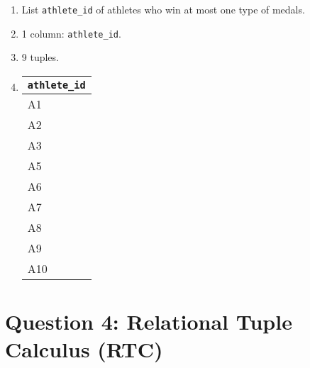 \documentclass{article}
\begin{document}
\begin{enumerate}
\begin{enumerate}
        \item List \texttt{athlete\_id} of athletes who win at most one type of medals.
        \item 1 column: \texttt{athlete\_id}.
        \item 9 tuples.
        \item 
        \begin{tabular}{@{}l@{}}
            \toprule
            \texttt{athlete\_id} \\ \midrule
            A1          \\
            A2          \\
            A3          \\
            A5          \\
            A6          \\
            A7          \\
            A8          \\
            A9          \\
            A10         \\ \bottomrule
        \end{tabular}
    \end{enumerate}
\end{enumerate}
\newpage

\section*{Question 4: Relational Tuple Calculus (RTC)}
\end{document}
